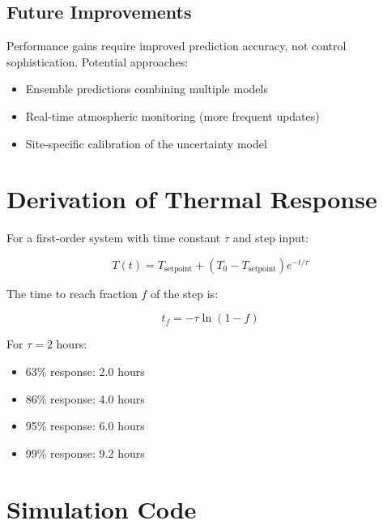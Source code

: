 \documentclass[11pt,letterpaper]{article}
\begin{document}
\subsection{Future Improvements}

Performance gains require improved prediction accuracy, not control sophistication. Potential approaches:

\begin{itemize}
    \item Ensemble predictions combining multiple models
    \item Real-time atmospheric monitoring (more frequent updates)
    \item Site-specific calibration of the uncertainty model
\end{itemize}

\appendix

\section{Derivation of Thermal Response}

For a first-order system with time constant $\tau$ and step input:

\begin{equation}
T(t) = T_{\text{setpoint}} + (T_0 - T_{\text{setpoint}}) e^{-t/\tau}
\end{equation}

The time to reach fraction $f$ of the step is:

\begin{equation}
t_f = -\tau \ln(1-f)
\end{equation}

For $\tau = 2$ hours:
\begin{itemize}
    \item 63\% response: 2.0 hours
    \item 86\% response: 4.0 hours
    \item 95\% response: 6.0 hours
    \item 99\% response: 9.2 hours
\end{itemize}

\section{Simulation Code}
\end{document}
